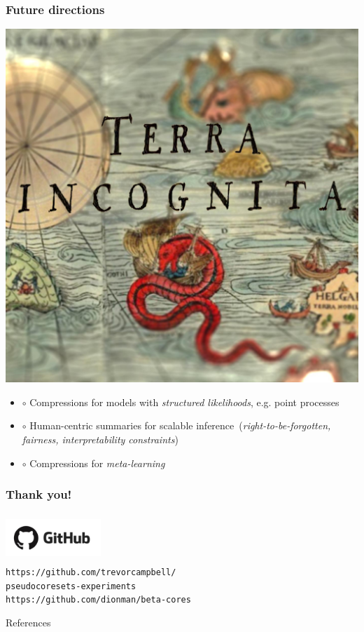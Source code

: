 \documentclass[hyperref={colorlinks = true},unknownkeysallowed]{beamer}
\begin{document}
\begin{frame}
	\frametitle{Future directions}
	\vspace{-1.7cm}
	\flushright \includegraphics[width=.49\textwidth]{figs/terra-incognita.png}	
	\begin{itemize}
	\item $\circ$ Compressions for models with \emph{structured likelihoods}, e.g. point processes
	\item $\circ$ Human-centric summaries for scalable inference~(\emph{right-to-be-forgotten, fairness, interpretability constraints})
	\item $\circ$ Compressions for \emph{meta-learning}
	\end{itemize}
\end{frame}


\begin{frame}
	\frametitle{Thank you!}
	\centering
	\includegraphics[width=3.6cm,height=1.8cm]{figs/github-logo.png}\\
	\texttt{https://github.com/trevorcampbell/\\pseudocoresets-experiments}\\ \texttt{https://github.com/dionman/beta-cores}
\end{frame}


\begin{frame}[allowframebreaks]{References}
	\tiny %
	
\end{frame}
\end{document}
